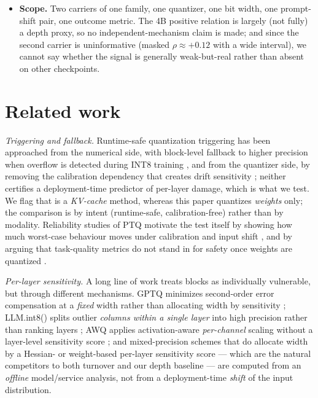 \documentclass{article}
\begin{document}
\begin{itemize}
        coverage (R37\_DEPTH\_REWEIGHT\_GATE3): on 4B the headline becomes
        $\rho(\tau,\delta)=0.401$ when the deep decile ceases to dominate, and the depth
        correlations shrink to the same degree (Table~\ref{tab:uncertainty-ledger}, Panel~A,
        re-weighted rows) --- so the depth proxy survives re-weighting but is partly inflated by
        the probe rule. Re-running the single-block-quantized outcome for the unprobed blocks (a
        depth-uniform or full-layer probe) remains the more expensive step beyond this study's
        budget and is not performed here.
  \item \textbf{Scope.} Two carriers of one family, one quantizer, one bit width, one prompt-shift
        pair, one outcome metric. The 4B positive relation is largely (not fully) a depth proxy, so
        no independent-mechanism claim is made; and since the second carrier is uninformative
        (masked $\rho\approx +0.12$ with a wide interval), we cannot say whether the signal is
        generally weak-but-real rather than absent on other checkpoints.
\end{itemize}

\section{Related work}
\label{sec:related}
\emph{Triggering and fallback.} Runtime-safe quantization triggering has been approached from the
numerical side, with block-level fallback to higher precision when overflow is detected during
INT8 training \citep{zhang2025int8fallback}, and from the quantizer side, by removing the
calibration dependency that creates drift sensitivity \citep{son2025nsnquant}; neither certifies a
deployment-time predictor of per-layer damage, which is what we test. We flag that
\citet{son2025nsnquant} is a \emph{KV-cache} method, whereas this paper quantizes \emph{weights}
only; the comparison is by intent (runtime-safe, calibration-free) rather than by modality.
Reliability studies of PTQ motivate the test itself by showing how much worst-case behaviour moves
under calibration and input shift \citep{yuan2023benchmarking}, and by arguing that task-quality
metrics do not stand in for safety once weights are quantized \citep{kadadekar2026qualitynotsafety}.

\emph{Per-layer sensitivity.} A long line of work treats blocks as individually vulnerable, but
through different mechanisms. GPTQ minimizes second-order error compensation at a \emph{fixed}
width rather than allocating width by sensitivity \citep{frantar2023gptq}; LLM.int8() splits
outlier \emph{columns within a single layer} into high precision rather than ranking layers
\citep{dettmers2022llmint8}; AWQ applies activation-aware \emph{per-channel} scaling without a
layer-level sensitivity score \citep{lin2024awq}; and mixed-precision schemes that do allocate
width by a Hessian- or weight-based per-layer sensitivity score
\citep{dong2019hawq,dettmers2023spqr,kim2024squeezellm} --- which are the natural competitors to
both turnover and our depth baseline --- are computed from an \emph{offline} model/service
analysis, not from a deployment-time \emph{shift} of the input distribution.
\end{document}
